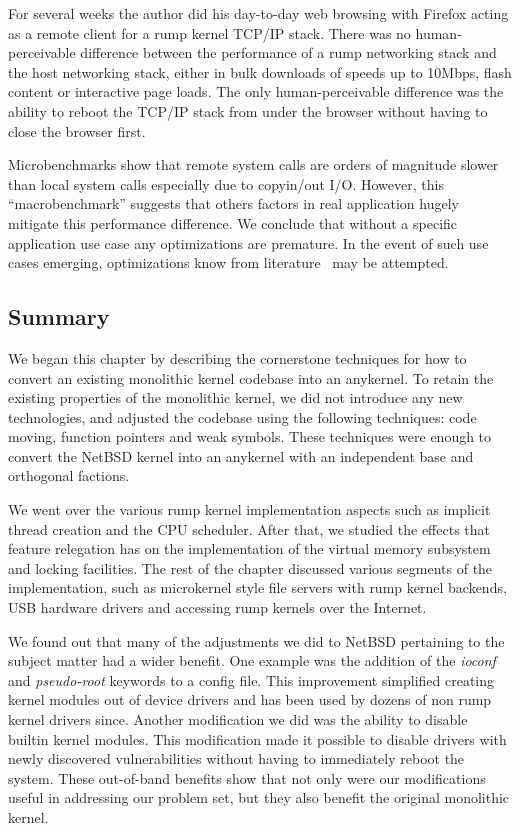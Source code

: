 For several weeks the author did his day-to-day web browsing with
Firefox acting as a remote client for a rump kernel TCP/IP stack.
There was no human-perceivable difference between the performance
of a rump networking stack and the host networking stack, either
in bulk downloads of speeds up to 10Mbps, flash content or interactive
page loads.  The only human-perceivable difference was the ability
to reboot the TCP/IP stack from under the browser without having
to close the browser first.

Microbenchmarks show that remote system calls are orders of magnitude
slower than local system calls especially due to copyin/out I/O.
However, this ``macrobenchmark'' suggests that others factors in
real application hugely mitigate this performance difference.  We
conclude that without a specific application use case any optimizations
are premature.  In the event of such use cases emerging, optimizations
know from literature~\cite{bershad:lrpc, liedtke:improving} may be
attempted.

\subsection{Summary}

We began this chapter by describing the cornerstone techniques for
how to convert an existing monolithic kernel codebase into an
anykernel.  To retain the existing properties of the monolithic
kernel, we did not introduce any new technologies, and adjusted
the codebase using the following techniques: code moving, function
pointers and weak symbols.  These techniques were enough to convert
the NetBSD kernel into an anykernel with an independent base and
orthogonal factions.

We went over the various rump kernel implementation aspects such
as implicit thread creation and the CPU scheduler.  After that, we
studied the effects that feature relegation has on the implementation
of the virtual memory subsystem and locking facilities.  The rest
of the chapter discussed various segments of the implementation,
such as microkernel style file servers with rump kernel backends, USB
hardware drivers and accessing rump kernels over the Internet.

We found out that many of the adjustments we did to NetBSD pertaining to
the subject matter had a wider benefit.  One example was the addition
of the \textit{ioconf} and \textit{pseudo-root} keywords to a config
file.  This improvement simplified creating kernel modules out of device drivers
and has been used by dozens of non rump kernel drivers since.
Another modification we did was the ability to disable builtin
kernel modules.  This modification made it possible to disable drivers with
newly discovered vulnerabilities without having to immediately
reboot the system.  These out-of-band benefits show that not only
were our modifications useful in addressing our problem set, but
they also benefit the original monolithic kernel.

